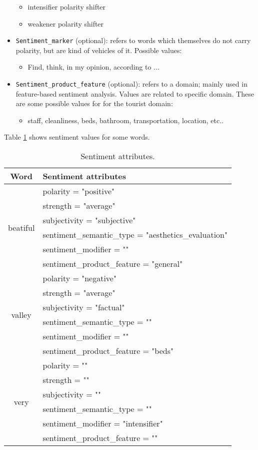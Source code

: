 \begin{itemize}
\begin{itemize}
  \item intensifier polarity shifter
  \item weakener polarity shifter
  \end{itemize}
\item \texttt{Sentiment\_marker} (optional): refers to words which
  themselves do not carry polarity, but are kind of vehicles of it. Possible
  values:
  \begin{itemize}
  \item Find, think, in my opinion, according to ...
  \end{itemize}
\item \texttt{Sentiment\_product\_feature} (optional): refers to a domain;
  mainly used in feature-based sentiment analysis. Values are related to
  specific domain. These are some possible values for for the tourist
  domain:
  \begin{itemize}
  \item staff, cleanliness, beds, bathroom, transportation, location, etc..
  \end{itemize}
\end{itemize}

Table \ref{tab:sent-attr-some} shows sentiment values for some words.

\begin{table}[t]
  \centering
  \ttfamily
  \small
  \begin{tabular}{|c|l|}
    \hline
    \textrm{Word} & \textrm{Sentiment attributes}\\
    \hline
    \multirow{6}{*}{\textrm{beatiful}} & polarity = "positive" \\
    & strength = "average" \\
    & subjectivity = "subjective"\\
    & sentiment\_semantic\_type = "aesthetics\_evaluation"\\
    & sentiment\_modifier = ""\\
    & sentiment\_product\_feature = "general"\\
    \hline
    \multirow{6}{*}{\textrm{valley}} & polarity = "negative"\\
    & strength = "average"\\
    & subjectivity = "factual"\\
    & sentiment\_semantic\_type = ""\\
    & sentiment\_modifier = ""\\
    & sentiment\_product\_feature = "beds"\\
    \hline
    \multirow{6}{*}{\textrm{very}} & polarity = ""\\
    & strength = ""\\
    & subjectivity = ""\\
    & sentiment\_semantic\_type = ""\\
    & sentiment\_modifier = "intensifier"\\
    & sentiment\_product\_feature = ""\\
    \hline
  \end{tabular}
  \caption{\textrm{Sentiment attributes.}}
  \label{tab:sent-attr-some}
\end{table}


